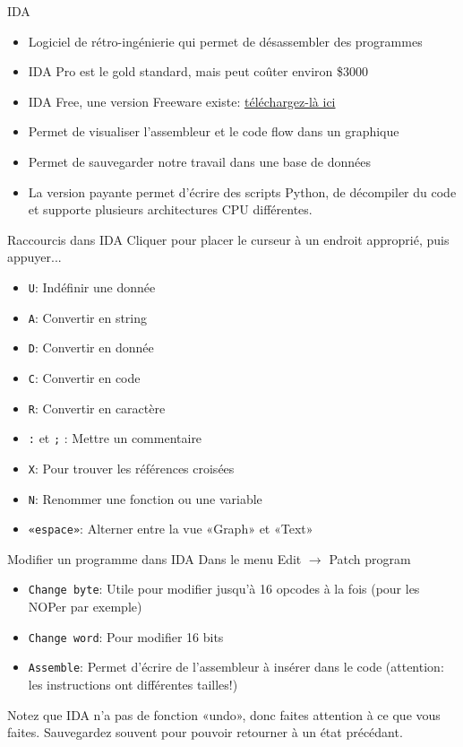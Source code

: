 \documentclass[10pt,xcolor={table,dvipsnames},t]{beamer}
\begin{document}
\begin{frame}{IDA}

    \begin{itemize}
        \item Logiciel de rétro-ingénierie qui permet de désassembler des programmes
        \item IDA Pro est le gold standard, mais peut coûter environ \$3000
        \item IDA Free, une version Freeware existe: \href{https://www.hex-rays.com/products/ida/support/download_freeware.shtml}{téléchargez-là ici} 
        \item Permet de visualiser l'assembleur et le code flow dans un graphique
        \item Permet de sauvegarder notre travail dans une base de données
        \item La version payante permet d'écrire des scripts Python, de décompiler du code et supporte plusieurs architectures CPU différentes.
    \end{itemize}
\end{frame}


\begin{frame}{Raccourcis dans IDA}
    Cliquer pour placer le curseur à un endroit approprié, puis appuyer...
    \begin{itemize}
        \item \texttt{U}: Indéfinir une donnée
        \item \texttt{A}: Convertir en string
        \item \texttt{D}: Convertir en donnée
        \item \texttt{C}: Convertir en code
        \item \texttt{R}: Convertir en caractère
        \item \texttt{:} et \texttt{;} : Mettre un commentaire
        \item \texttt{X}: Pour trouver les références croisées
        \item \texttt{N}: Renommer une fonction ou une variable
        \item \texttt{«espace»}: Alterner entre la vue «Graph» et «Text»
    \end{itemize}
\end{frame}


\begin{frame}{Modifier un programme dans IDA}
    Dans le menu Edit $\rightarrow$  Patch program
    \begin{itemize}
        \item \texttt{Change byte}: Utile pour modifier jusqu'à 16 opcodes à la fois (pour les NOPer par exemple)
        \item \texttt{Change word}: Pour modifier 16 bits
        \item \texttt{Assemble}: Permet d'écrire de l'assembleur à insérer dans le code (attention: les instructions ont différentes tailles!)
    \end{itemize}
    
    Notez que IDA n'a pas de fonction «undo», donc faites attention à ce que vous faites. Sauvegardez souvent pour pouvoir retourner à un état précédant.
\end{frame}
\end{document}
